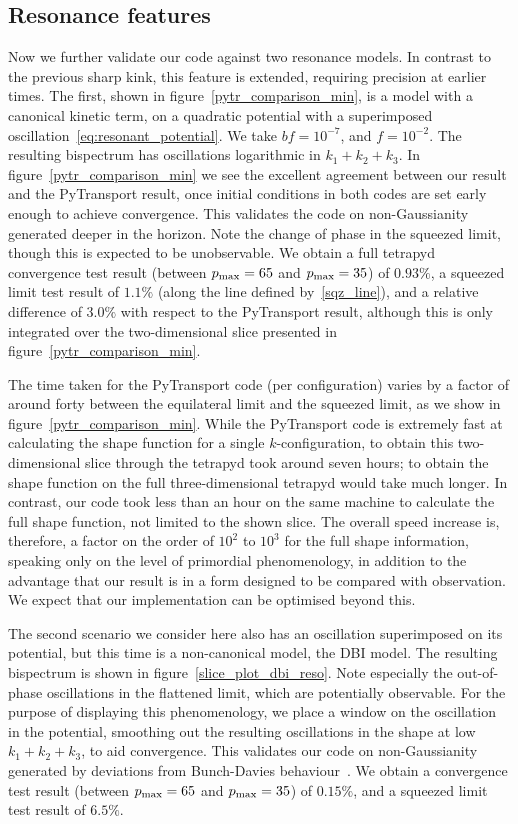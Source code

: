 \subsection{Resonance features}
Now we further validate our code against two
resonance models. In contrast to the previous sharp kink,
this feature is extended, requiring precision at earlier times.
The first, shown in figure~\ref{pytr_comparison_min},
is a model with a canonical kinetic term, on a
quadratic potential with a superimposed
oscillation~\eqref{eq:resonant_potential}.
We take $bf=10^{-7}$, and $f=10^{-2}$.
The resulting bispectrum has oscillations logarithmic in $k_1+k_2+k_3$.
In figure~\ref{pytr_comparison_min} we see the excellent agreement
between our result and the PyTransport result, once initial conditions
in both codes are set early enough to achieve convergence.
This validates the code on non-Gaussianity generated deeper
in the horizon. Note the change of phase in the squeezed limit,
though this is expected to be unobservable.
We obtain a full tetrapyd convergence test result
(between $p_\text{max}=65$ and $p_\text{max}=35$)
of $0.93\%$, a squeezed limit test result of $1.1\%$
(along the line defined by~\eqref{sqz_line}),
and a relative difference of $3.0\%$ with respect to the
PyTransport result,
although this is only integrated over the two-dimensional slice presented in
figure~\ref{pytr_comparison_min}.


The time taken for the PyTransport code (per configuration) varies by a factor of around forty
between the equilateral limit and the squeezed limit,
as we show in figure~\ref{pytr_comparison_min}.
While the PyTransport code is extremely fast at calculating the shape function
for a single $k$-configuration,
to obtain this two-dimensional slice through the tetrapyd took around seven hours;
to obtain the shape function on the full three-dimensional tetrapyd would take much longer.
In contrast, our code took less than an hour on the same machine to calculate
the full shape function, not limited to the shown slice.
The overall speed increase is, therefore, a factor on the order of $10^2$ to $10^3$
for the full shape information, speaking only on the level of primordial
phenomenology, in addition to the advantage that our result is in a form
designed to be compared with observation.
We expect that our implementation can be optimised beyond this.


The second scenario we consider here also has an
oscillation superimposed on its potential, but this time
is a non-canonical model, the DBI model.
The resulting bispectrum is shown in figure~\ref{slice_plot_dbi_reso}.
Note especially the out-of-phase oscillations in the flattened limit,
which are potentially observable.
For the purpose of displaying this phenomenology, we place a window
on the oscillation in the potential, smoothing out the resulting oscillations
in the shape at low $k_1+k_2+k_3$, to aid convergence.
This validates our code on non-Gaussianity generated by deviations from Bunch-Davies
behaviour~\cite{chen_folded_resonant,features_bartolo}.
We obtain a convergence test result (between $p_\text{max}=65$ and $p_\text{max}=35$)
of $0.15\%$, and a squeezed limit test result of $6.5\%$.


